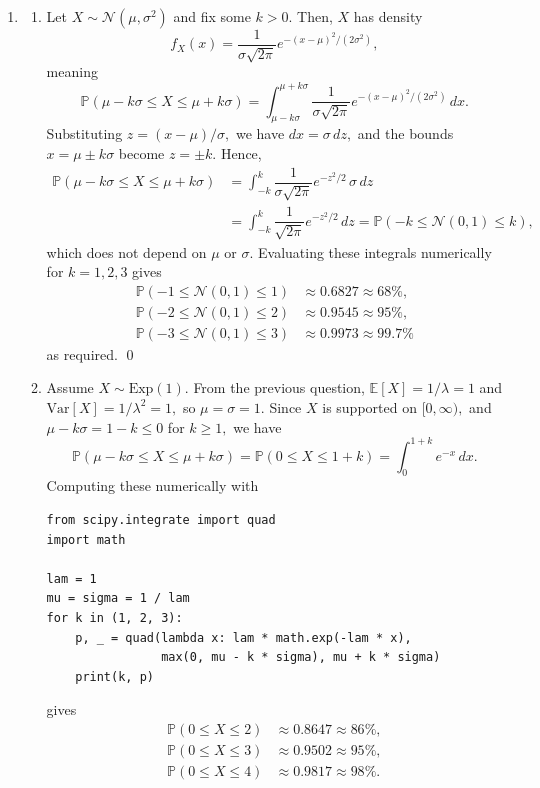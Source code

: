 \documentclass[12pt]{article}
\begin{document}
\begin{enumerate}
  \item
    \begin{enumerate}
      \item Let $X \sim \mathcal N(\mu, \sigma^2)$ and fix some $k >
        0.$ Then, $X$ has density
        $$
        f_X(x) = \dfrac{1}{\sigma\sqrt{2\pi}} e^{-(x - \mu)^2/(2\sigma^2)},
        $$
        meaning
        $$
        \mathbb P(\mu - k\sigma \leq X \leq \mu + k\sigma) =
        \int_{\mu - k\sigma}^{\mu + k\sigma}
        \dfrac{1}{\sigma\sqrt{2\pi}} e^{-(x - \mu)^2/(2\sigma^2)} \, dx.
        $$
        Substituting $z = (x - \mu)/\sigma,$ we have $dx = \sigma \,
        dz,$ and the bounds $x = \mu \pm k\sigma$ become $z = \pm k.$ Hence,
        \begin{align*}
          \mathbb P(\mu - k\sigma \leq X \leq \mu + k\sigma) &=
          \int_{-k}^{k} \dfrac{1}{\sigma\sqrt{2\pi}} e^{-z^2/2} \,
          \sigma \, dz \\
          &= \int_{-k}^{k} \dfrac{1}{\sqrt{2\pi}} e^{-z^2/2} \, dz =
          \mathbb P(-k \leq \mathcal N(0, 1) \leq k),
        \end{align*}
        which does not depend on $\mu$ or $\sigma.$ Evaluating these
        integrals numerically for $k = 1, 2, 3$ gives
        \begin{align*}
          \mathbb P(-1 \leq \mathcal N(0, 1) \leq 1) &\approx 0.6827
          \approx 68\%, \\
          \mathbb P(-2 \leq \mathcal N(0, 1) \leq 2) &\approx 0.9545
          \approx 95\%, \\
          \mathbb P(-3 \leq \mathcal N(0, 1) \leq 3) &\approx 0.9973
          \approx 99.7\%
        \end{align*}
        as required. \qed

      \item Assume $X \sim \text{Exp}(1).$ From the previous
        question, $\mathbb E[X] = 1/\lambda = 1$ and $\text{Var}[X] =
        1/\lambda^2 = 1,$ so $\mu = \sigma = 1.$ Since $X$ is
        supported on $[0, \infty),$ and $\mu - k\sigma = 1 - k \leq
        0$ for $k \geq 1,$ we have
        $$
        \mathbb P(\mu - k\sigma \leq X \leq \mu + k\sigma) = \mathbb
        P(0 \leq X \leq 1 + k) = \int_{0}^{1 + k} e^{-x} \, dx.
        $$
        Computing these numerically with
\begin{verbatim}
from scipy.integrate import quad
import math

lam = 1
mu = sigma = 1 / lam
for k in (1, 2, 3):
    p, _ = quad(lambda x: lam * math.exp(-lam * x),
                max(0, mu - k * sigma), mu + k * sigma)
    print(k, p)
\end{verbatim}
        gives
        \begin{align*}
          \mathbb P(0 \leq X \leq 2) &\approx 0.8647 \approx 86\%, \\
          \mathbb P(0 \leq X \leq 3) &\approx 0.9502 \approx 95\%, \\
          \mathbb P(0 \leq X \leq 4) &\approx 0.9817 \approx 98\%.
        \end{align*}


\end{enumerate}
\end{enumerate}
\end{document}
